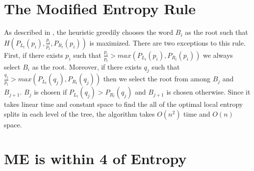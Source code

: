 \documentclass[letterpaper,12pt,titlepage,oneside,final]{book}
\theoremstyle{plain}
\begin{document}
\section{The Modified Entropy Rule}

As described in \cite{guttler1980binary}, the heuristic greedily chooses the word $B_i$ as the root such that $H(P_{L_t}(p_i), \frac{p_i}{p_t}, P_{R_t}(p_i))$ is maximized. There are two exceptions to this rule. First, if there exists $p_i$ such that $\frac{p_i}{p_t} > max(P_{L_t}(p_i), P_{R_t}(p_i))$ we always select $B_i$ as the root. Moreover, if there exists $q_j$ such that $\frac{q_j}{p_t} > max(P_{L_t}(q_j), P_{R_t}(q_j))$ then we select the root from among $B_j$ and $B_{j+1}$. $B_j$ is chosen if $P_{L_t}(q_j) > P_{R_t}(q_j)$ and $B_{j+1}$ is chosen otherwise. Since it takes linear time and constant space to find the all of the optimal local entropy splits in each level of the tree, the algorithm takes $O(n^2)$ time and $O(n)$ space.  \\

\section{ME is within 4 of Entropy}
\end{document}
